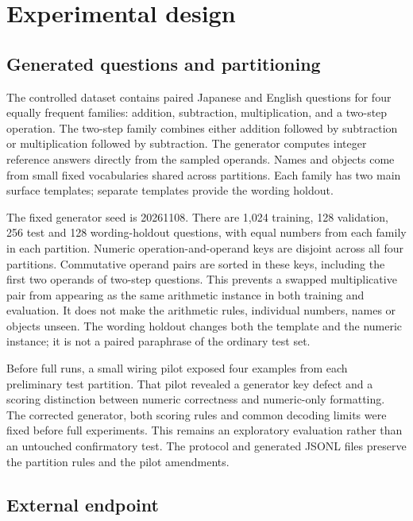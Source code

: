 \section{Experimental design}
\label{sec:experiments}

\subsection{Generated questions and partitioning}

The controlled dataset contains paired Japanese and English questions for four equally frequent families: addition, subtraction, multiplication, and a two-step operation.
The two-step family combines either addition followed by subtraction or multiplication followed by subtraction.
The generator computes integer reference answers directly from the sampled operands.
Names and objects come from small fixed vocabularies shared across partitions.
Each family has two main surface templates; separate templates provide the wording holdout.

The fixed generator seed is 20261108.
There are 1,024 training, 128 validation, 256 test and 128 wording-holdout questions, with equal numbers from each family in each partition.
Numeric operation-and-operand keys are disjoint across all four partitions.
Commutative operand pairs are sorted in these keys, including the first two operands of two-step questions.
This prevents a swapped multiplicative pair from appearing as the same arithmetic instance in both training and evaluation.
It does not make the arithmetic rules, individual numbers, names or objects unseen.
The wording holdout changes both the template and the numeric instance; it is not a paired paraphrase of the ordinary test set.

Before full runs, a small wiring pilot exposed four examples from each preliminary test partition.
That pilot revealed a generator key defect and a scoring distinction between numeric correctness and numeric-only formatting.
The corrected generator, both scoring rules and common decoding limits were fixed before full experiments.
This remains an exploratory evaluation rather than an untouched confirmatory test.
The protocol and generated JSONL files preserve the partition rules and the pilot amendments.

\subsection{External endpoint}

